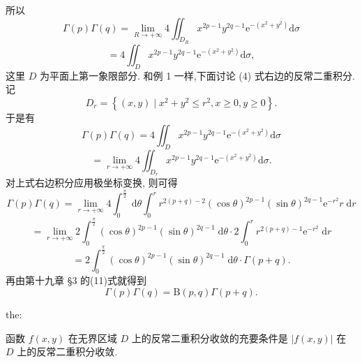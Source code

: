 所以
\[
\Gamma \left( p\right) \Gamma \left( q\right)  = \mathop{\lim }\limits_{{R \rightarrow   + \infty }}4{\iint }_{{D}_{R}}{x}^{{2p} - 1}{y}^{{2q} - 1}{\mathrm{e}}^{-\left( {{x}^{2} + {y}^{2}}\right) }\mathrm{d}\sigma
\]
\[
= 4{\iint }_{D}{x}^{{2p} - 1}{y}^{{2q} - 1}{\mathrm{e}}^{-\left( {{x}^{2} + {y}^{2}}\right) }\mathrm{d}\sigma , \tag{4}
\]
这里 \(D\) 为平面上第一象限部分. 和例 1 一样,下面讨论 (4) 式右边的反常二重积分. 记
\[
{D}_{r} = \left\{  {\left( {x,y}\right)  \mid  {x}^{2} + {y}^{2} \leq  {r}^{2},x \geq  0,y \geq  0}\right\}  .
\]
于是有
\[
\Gamma \left( p\right) \Gamma \left( q\right)  = 4{\iint }_{D}{x}^{{2p} - 1}{y}^{{2q} - 1}{\mathrm{e}}^{-\left( {{x}^{2} + {y}^{2}}\right) }\mathrm{d}\sigma
\]
\[
= \mathop{\lim }\limits_{{r \rightarrow   + \infty }}4{\iint }_{{D}_{r}}{x}^{{2p} - 1}{y}^{{2q} - 1}{\mathrm{e}}^{-\left( {{x}^{2} + {y}^{2}}\right) }\mathrm{d}\sigma .
\]
对上式右边积分应用极坐标变换, 则可得
\[
\Gamma \left( p\right) \Gamma \left( q\right)  = \mathop{\lim }\limits_{{r \rightarrow   + \infty }}4{\int }_{0}^{\frac{\pi }{2}}\mathrm{\;d}\theta {\int }_{0}^{r}{r}^{2\left( {p + q}\right)  - 2}{\left( \cos \theta \right) }^{{2p} - 1}{\left( \sin \theta \right) }^{{2q} - 1}{\mathrm{e}}^{-{r}^{2}}r\mathrm{\;d}r
\]
\[
= \mathop{\lim }\limits_{{r \rightarrow   + \infty }}2{\int }_{0}^{\frac{\pi }{2}}{\left( \cos \theta \right) }^{{2p} - 1}{\left( \sin \theta \right) }^{{2q} - 1}\mathrm{\;d}\theta  \cdot  2{\int }_{0}^{r}{r}^{2\left( {p + q}\right)  - 1}{\mathrm{e}}^{-{r}^{2}}\mathrm{\;d}r
\]
\[
= 2{\int }_{0}^{\frac{\pi }{2}}{\left( \cos \theta \right) }^{{2p} - 1}{\left( \sin \theta \right) }^{{2q} - 1}\mathrm{\;d}\theta  \cdot  \Gamma \left( {p + q}\right) .
\]
再由第十九章 §3 的(11)式就得到
\[
\Gamma \left( p\right) \Gamma \left( q\right)  = \mathrm{B}\left( {p,q}\right) \Gamma \left( {p + q}\right) .
\]
\begin{theorem}{}{the:}

\end{theorem}
 函数 \(f\left( {x,y}\right)\) 在无界区域 \(D\) 上的反常二重积分收敛的充要条件是 \(\left| {f\left( {x,y}\right) }\right|\) 在 \(D\) 上的反常二重积分收敛.

